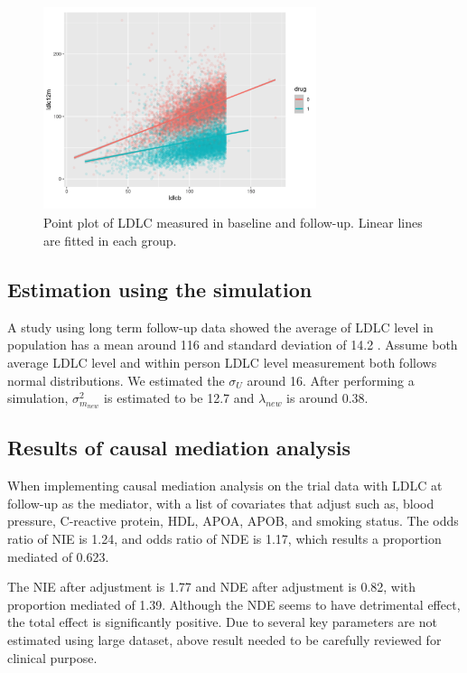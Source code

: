 \documentclass{article}
\begin{document}
\begin{figure}[h]
\centering
\includegraphics[width = 8cm,height = 6cm]{figure-11.png}
\caption{Point plot of LDLC measured in baseline and follow-up. Linear lines are fitted in each group. }
\label{fig11}
\end{figure}


\subsection{Estimation using the simulation}

A study using long term follow-up data showed the average of LDLC level in population has a mean around 116 and standard deviation of 14.2 \cite{takahashi2010lipid}. Assume both average LDLC level and within person LDLC level measurement both follows normal distributions. We estimated the $\sigma_U$ around 16. After performing a simulation,  $\sigma^2_{m_{new}}$ is estimated to be 12.7 and $\lambda_{new}$ is around 0.38. 

\subsection{Results of causal mediation analysis}

When implementing causal mediation analysis on the trial data with LDLC at follow-up as the mediator, with a list of covariates that adjust such as, blood pressure, C-reactive protein, HDL, APOA, APOB, and smoking status. The odds ratio of NIE is 1.24, and odds ratio of NDE is 1.17, which results a proportion mediated of 0.623.

The NIE after adjustment is 1.77 and NDE after adjustment is 0.82, with proportion mediated of 1.39.  Although the NDE seems to have detrimental effect, the total effect is significantly positive. Due to several key parameters are not estimated using large dataset, above result needed to be carefully reviewed for clinical purpose. 
\end{document}
